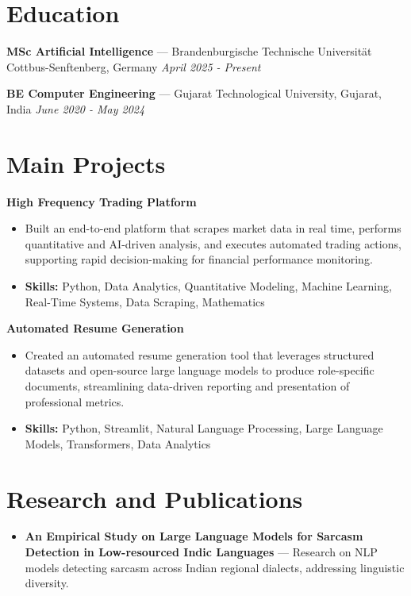 \documentclass[a4paper,10pt]{article}
\begin{document}
\section*{Education}
\textbf{MSc Artificial Intelligence} — Brandenburgische Technische Universität Cottbus-Senftenberg, Germany \hfill \textit{April 2025 - Present}\par
\vspace{1.5pt}
\textbf{BE Computer Engineering} — Gujarat Technological University, Gujarat, India \hfill \textit{June 2020 - May 2024}\par

\section*{Main Projects}
\textbf{High Frequency Trading Platform}\par
\vspace{1pt}
\begin{itemize}
  \item Built an end-to-end platform that scrapes market data in real time, performs quantitative and AI-driven analysis, and executes automated trading actions, supporting rapid decision-making for financial performance monitoring.
  \item \textbf{Skills:} Python, Data Analytics, Quantitative Modeling, Machine Learning, Real-Time Systems, Data Scraping, Mathematics
\end{itemize}
\vspace{3pt}
\textbf{Automated Resume Generation}\par
\vspace{1pt}
\begin{itemize}
  \item Created an automated resume generation tool that leverages structured datasets and open-source large language models to produce role-specific documents, streamlining data-driven reporting and presentation of professional metrics.
  \item \textbf{Skills:} Python, Streamlit, Natural Language Processing, Large Language Models, Transformers, Data Analytics
\end{itemize}

\section*{Research and Publications}
\begin{itemize}
\item \textbf{An Empirical Study on Large Language Models for Sarcasm Detection in Low-resourced Indic Languages} — Research on NLP models detecting sarcasm across Indian regional dialects, addressing linguistic diversity.
\end{itemize}
\end{document}

